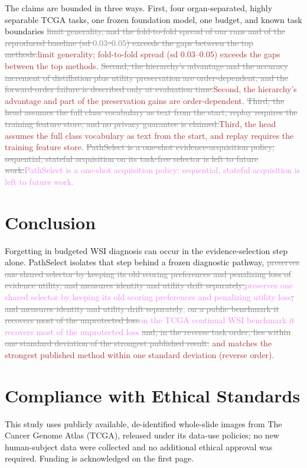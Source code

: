 \documentclass{article}
\newif\ifmarkup \markuptrue
\newcommand{\repc}[3]{\ifmarkup\textcolor{gray}{\sout{#2}}\textcolor{#1}{#3}\else#3\fi}
\newcommand{\repP}[2]{\repc{violet}{#1}{#2}}  %
\newcommand{\repB}[2]{\repc{brown}{#1}{#2}}   %
\newcommand{\delB}[1]{\ifmarkup\textcolor{gray}{\sout{#1}}\fi}
\begin{document}
The claims are bounded in three ways. First, four organ-separated, highly separable TCGA tasks, one frozen foundation model, one budget, and known task boundaries \repB{limit generality, and the fold-to-fold spread of our runs and of the reproduced baseline (sd $0.03$--$0.05$) exceeds the gaps between the top methods.}{limit generality; fold-to-fold spread (sd $0.03$--$0.05$) exceeds the gaps between the top methods.} \repB{Second, the hierarchy's advantage and the accuracy increment of distillation plus utility preservation are order-dependent, and the forward-order failure is described only at evaluation time.}{Second, the hierarchy's advantage and part of the preservation gains are order-dependent.} \repB{Third, the head assumes the full class vocabulary as text from the start, replay requires the training feature store, and no privacy guarantee is claimed.}{Third, the head assumes the full class vocabulary as text from the start, and replay requires the training feature store.} \repP{PathSelect is a one-shot evidence-acquisition policy; sequential, stateful acquisition on its task-free selector is left to future work.}{PathSelect is a one-shot acquisition policy; sequential, stateful acquisition is left to future work.}

\section{Conclusion}

Forgetting in budgeted WSI diagnosis can occur in the evidence-selection step alone. PathSelect isolates that step behind a frozen diagnostic pathway, \repP{preserves one shared selector by keeping its old scoring preferences and penalizing loss of evidence utility, and measures identity and utility drift separately;}{preserves one shared selector by keeping its old scoring preferences and penalizing utility loss\delB{, and measures identity and utility drift separately};} \repP{on a public benchmark it recovers most of the unprotected loss}{on the TCGA continual WSI benchmark it recovers most of the unprotected loss}\repB{ and, in the reverse task order, lies within one standard deviation of the strongest published result.}{ and matches the strongest published method within one standard deviation (reverse order).}




\section*{Compliance with Ethical Standards}
This study uses publicly available, de-identified whole-slide images from The Cancer Genome Atlas (TCGA), released under its data-use policies; no new human-subject data were collected and no additional ethical approval was required. Funding is acknowledged on the first page.
\end{document}
